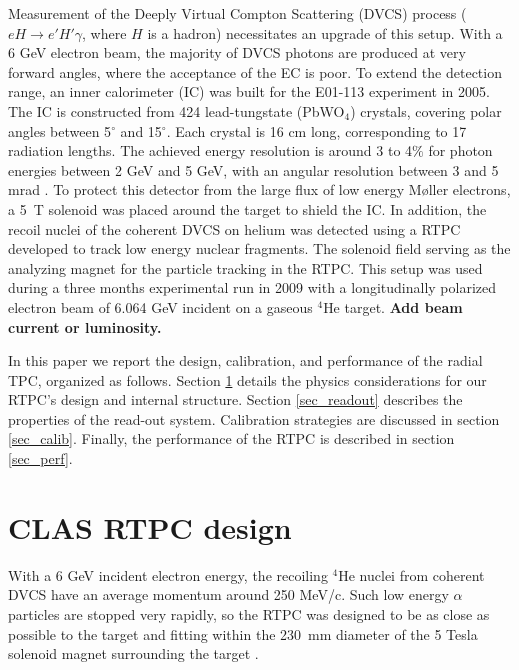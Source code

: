 \documentclass[twocolumn,showpacs,superscriptaddress,groupedaddress]{revtex4}
\begin{document}
Measurement of the Deeply Virtual Compton Scattering (DVCS) process
($eH \rightarrow e' H' \gamma$, where $H$ is a hadron) necessitates an upgrade
of this setup.  With a 6 GeV electron beam, the majority of DVCS photons are produced
at very forward angles, where the acceptance of the EC is poor. To extend the detection range,
an inner calorimeter (IC) was built for the E01-113 experiment in 2005.
The IC is constructed from 424 lead-tungstate (PbWO$_{4}$) crystals, covering polar 
angles between 5$^{\circ}$ and 15$^{\circ}$. Each crystal is 16 cm long, corresponding
to 17 radiation lengths. The achieved energy resolution is around 3 to 4$\%$ for photon
energies between 2 GeV and 5 GeV, with an angular resolution between 3 and 5 mrad 
\cite{Hyon-suk}. To protect this detector from the large flux of low energy M{\o}ller 
electrons, a 5~T solenoid was placed around the target to shield the IC. 
In addition, the recoil nuclei of the coherent DVCS on helium was detected 
using a RTPC developed to track low energy nuclear fragments. The solenoid field
serving as the analyzing magnet for the particle tracking in the RTPC. This 
setup was used during a three months experimental run
in 2009 with a longitudinally polarized electron beam of 6.064 GeV incident 
on a gaseous $^{4}$He target.
{\bf \color{red} Add beam current or luminosity.}

In this paper we report the design, calibration, and performance of the radial TPC,
organized as follows. Section \ref{sec_design} details the physics considerations for our RTPC's
design and internal structure. Section \ref{sec_readout} describes the properties
of the read-out system. Calibration strategies are discussed in section \ref{sec_calib}.
Finally, the performance of the RTPC is described in section \ref{sec_perf}.


\section{CLAS RTPC design} \label{sec_design}

With a 6 GeV incident electron energy, the recoiling $^{4}$He nuclei from coherent 
DVCS have an average momentum around 250 MeV/c. Such low energy $\alpha$ 
particles are stopped very rapidly, so the RTPC was designed to be as close 
as possible to the target and fitting within the 230~mm diameter 
of the 5 Tesla solenoid magnet surrounding the target \cite{Hyon-suk}. 
\end{document}
